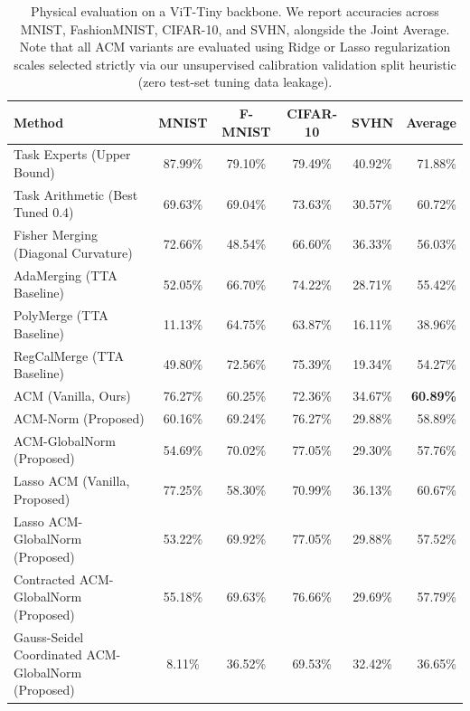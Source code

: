 \begin{table}[t]
\caption{Physical evaluation on a ViT-Tiny backbone. We report accuracies across MNIST, FashionMNIST, CIFAR-10, and SVHN, alongside the Joint Average. Note that all ACM variants are evaluated using Ridge or Lasso regularization scales selected strictly via our unsupervised calibration validation split heuristic (zero test-set tuning data leakage).}
\label{tab:physical_results}
\vskip 0.15in
\begin{center}
\begin{small}
\begin{sc}
\begin{tabular}{lccccr}
\toprule
Method & MNIST & F-MNIST & CIFAR-10 & SVHN & Average \\
\midrule
Task Experts (Upper Bound) & 87.99\% & 79.10\% & 79.49\% & 40.92\% & 71.88\% \\
\midrule
Task Arithmetic (Best Tuned 0.4) & 69.63\% & 69.04\% & 73.63\% & 30.57\% & 60.72\% \\
Fisher Merging (Diagonal Curvature) & 72.66\% & 48.54\% & 66.60\% & 36.33\% & 56.03\% \\
AdaMerging (TTA Baseline) & 52.05\% & 66.70\% & 74.22\% & 28.71\% & 55.42\% \\
PolyMerge (TTA Baseline) & 11.13\% & 64.75\% & 63.87\% & 16.11\% & 38.96\% \\
RegCalMerge (TTA Baseline) & 49.80\% & 72.56\% & 75.39\% & 19.34\% & 54.27\% \\
\midrule
ACM (Vanilla, Ours) & 76.27\% & 60.25\% & 72.36\% & 34.67\% & \textbf{60.89\%} \\
ACM-Norm (Proposed) & 60.16\% & 69.24\% & 76.27\% & 29.88\% & 58.89\% \\
ACM-GlobalNorm (Proposed) & 54.69\% & 70.02\% & 77.05\% & 29.30\% & 57.76\% \\
Lasso ACM (Vanilla, Proposed) & 77.25\% & 58.30\% & 70.99\% & 36.13\% & 60.67\% \\
Lasso ACM-GlobalNorm (Proposed) & 53.22\% & 69.92\% & 77.05\% & 29.88\% & 57.52\% \\
Contracted ACM-GlobalNorm (Proposed) & 55.18\% & 69.63\% & 76.66\% & 29.69\% & 57.79\% \\
Gauss-Seidel Coordinated ACM-GlobalNorm (Proposed) & 8.11\% & 36.52\% & 69.53\% & 32.42\% & 36.65\% \\
\bottomrule
\end{tabular}
\end{sc}
\end{small}
\end{center}
\vskip -0.1in
\end{table}

